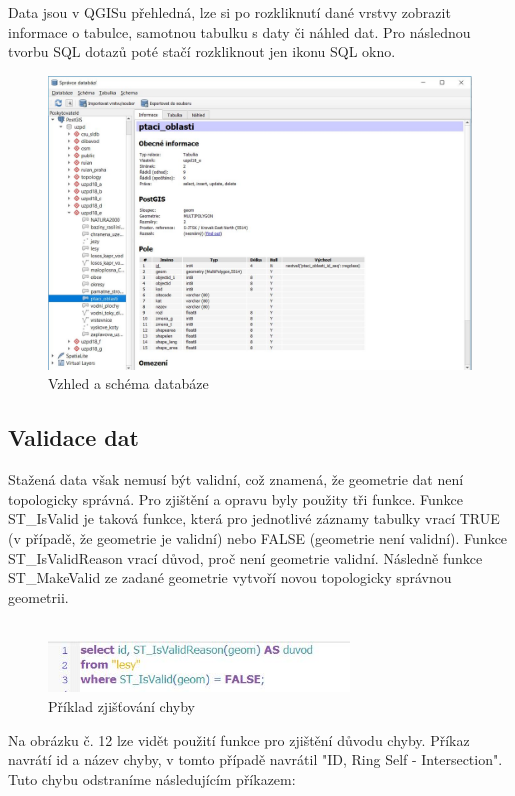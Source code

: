 \documentclass[a4paper, 12pt]{article}
\begin{document}
Data jsou v QGISu přehledná, lze si po rozkliknutí dané vrstvy zobrazit informace o tabulce, samotnou tabulku s daty či náhled dat. Pro následnou tvorbu SQL dotazů poté stačí rozkliknout jen ikonu SQL okno.

\begin{figure}[h!]
	\centering
	\includegraphics[width=12cm]{pictures/vzhled.jpg}
	\caption{Vzhled a schéma databáze}
\end{figure}

\subsection{Validace dat}
Stažená data však nemusí být validní, což znamená, že geometrie dat není topologicky správná. Pro zjištění a opravu byly použity tři funkce. Funkce ST\_IsValid je taková funkce, která pro jednotlivé záznamy tabulky vrací TRUE (v případě, že geometrie je validní) nebo FALSE (geometrie není validní). Funkce ST\_IsValidReason vrací důvod, proč není geometrie validní. Následně funkce ST\_MakeValid ze zadané geometrie vytvoří novou topologicky správnou geometrii.\\
\\
\begin{figure}[h!]
	\centering
	\includegraphics[width=8cm]{pictures/validace.jpg}
	\caption{Příklad zjišťování chyby}
\end{figure}

Na obrázku č. 12 lze vidět použití funkce pro zjištění důvodu chyby. Příkaz navrátí id a název chyby, v tomto případě navrátil "ID, Ring Self - Intersection". Tuto chybu odstraníme následujícím příkazem: \\
\end{document}
